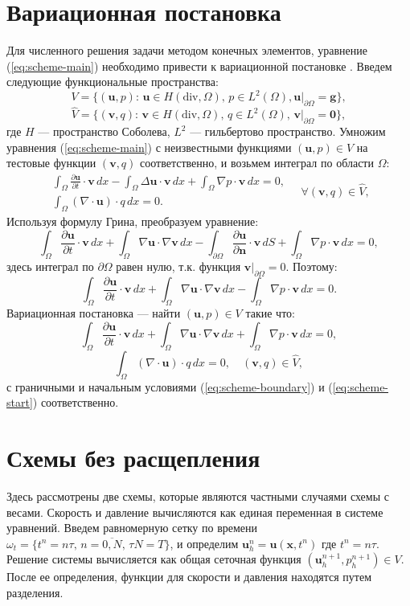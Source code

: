\documentclass[12pt]{article}
\begin{document}
\section{Вариационная постановка}
Для численного решения задачи методом конечных элементов, уравнение (\ref{eq:scheme-main}) необходимо привести к вариационной постановке \cite{fenicsbook-2012}. Введем следующие функциональные пространства:
$$
V=\{ ({\bm u}, p) : \, {\bm u} \in H(\mathrm{div}, \Omega), \, p \in L^2(\Omega),  {\bm u}|_{\partial \Omega}= {\bm g} \},
$$
$$
\hat V=\{ ({\bm v}, q) : \, {\bm v} \in H(\mathrm{div}, \Omega), \, q \in L^2(\Omega), \, {\bm v}|_{\partial \Omega}={\bm 0} \},
$$
где $H$ --- пространство Соболева, $L^2$ --- гильбертово пространство.
Умножим уравнения (\ref{eq:scheme-main}) с неизвестными функциями $({\bm u}, p) \in V$  на тестовые функции $({\bm v}, q)$ соответственно, и возьмем интеграл по области $\Omega$:
$$
\begin{aligned}
\int_{\Omega} \frac{\partial {\bm u}}{\partial t} \cdot {\bm v} \,dx - \int_{\Omega} \Delta {\bm u} \cdot {\bm v} \,dx + \int_{\Omega} \nabla p \cdot {\bm v} \,dx = 0, \\
\int_{\Omega} (\nabla \cdot {\bm u}) \cdot q \,dx = 0.
\end{aligned}
\quad \forall ({\bm v},q) \in \hat V,
$$
Используя формулу Грина, преобразуем уравнение:
$$
\int_{\Omega} \frac{\partial {\bm u}}{\partial t} \cdot {\bm v} \,dx + \int_{\Omega} \nabla {\bm u} \cdot \nabla {\bm v} \,dx - \int_{\partial \Omega} \frac{\partial {\bm u}}{\partial {\bm n}} \cdot {\bm v} \,dS + \int_{\Omega} \nabla p \cdot {\bm v} \,dx = 0,
$$
здесь интеграл по $\partial \Omega$ равен нулю, т.к. функция ${\bm v} | _ {\partial \Omega} = 0$. Поэтому:
$$
\int_{\Omega} \frac{\partial {\bm u}}{\partial t} \cdot {\bm v} \,dx + \int_{\Omega} \nabla {\bm u} \cdot \nabla {\bm v} \,dx - \int_{\Omega} \nabla p \cdot {\bm v} \,dx = 0.
$$
Вариационная постановка --- найти $({\bm u}, p) \in V$ такие что:
$$
\int_{\Omega} \frac{\partial {\bm u}}{\partial t} \cdot {\bm v} \,dx + \int_{\Omega} \nabla {\bm u} \cdot \nabla {\bm v} \,dx + \int_{\Omega} \nabla p \cdot {\bm v} \,dx = 0, 
$$
$$
\int_{\Omega} (\nabla \cdot {\bm u}) \cdot q \,dx = 0, \quad ({\bm v}, q) \in \hat V,
$$
с граничными и начальным условиями (\ref{eq:scheme-boundary}) и (\ref{eq:scheme-start}) соответственно.

\section{Схемы без расщепления}
Здесь рассмотрены две схемы, которые являются частными случаями схемы с весами.
Скорость и давление вычисляются как единая переменная в системе уравнений. Введем равномерную сетку по времени $\omega_t=\{t^n=n\tau, \, n=\overline{0,N}, \, \tau N = T \}$, и определим ${\bm u}_h^n={\bm u}({\bm x}, t^n)$ где $t^n=n\tau$. Решение системы вычисляется как общая сеточная функция $({\bm u}_h^{n+1}, p_h^{n+1}) \in V$. После ее определения, функции для скорости и давления находятся путем разделения.
\end{document}
